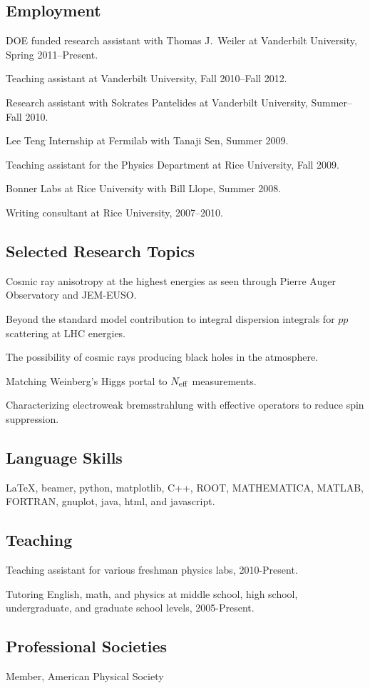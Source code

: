 \documentclass[letterpaper]{article}
\renewenvironment{itemize}{
\begin{list}{}{
\setlength{\leftmargin}{1.5em}
}
}{
\end{list}
}
\begin{document}
\subsection*{Employment}
\begin{itemize}
\item DOE funded research assistant with Thomas J.~Weiler at Vanderbilt University, Spring 2011--Present.
\item Teaching assistant at Vanderbilt University, Fall 2010--Fall 2012.
\item Research assistant with Sokrates Pantelides at Vanderbilt University, Summer--Fall 2010.
\item Lee Teng Internship at Fermilab with Tanaji Sen, Summer 2009.
\item Teaching assistant for the Physics Department at Rice University, Fall 2009.
\item Bonner Labs at Rice University with Bill Llope, Summer 2008.
\item Writing consultant at Rice University, 2007--2010.
\end{itemize}
\subsection*{Selected Research Topics}
\begin{itemize}
\item Cosmic ray anisotropy at the highest energies as seen through Pierre Auger Observatory and JEM-EUSO.
\item Beyond the standard model contribution to integral dispersion integrals for $pp$ scattering at LHC energies.
\item The possibility of cosmic rays producing black holes in the atmosphere.
\item Matching Weinberg's Higgs portal to $N_{\rm{eff}}$ measurements.
\item Characterizing electroweak bremsstrahlung with effective operators to reduce spin suppression.
\end{itemize}
\subsection*{Language Skills}
\begin{itemize}
\item 
\LaTeX, beamer, python, matplotlib, C++, ROOT, MATHEMATICA, MATLAB, FORTRAN, gnuplot, java, html, and javascript.
\end{itemize}
\subsection*{Teaching}
\begin{itemize}
\item Teaching assistant for various freshman physics labs, 2010-Present.
\item Tutoring English, math, and physics at middle school, high school, undergraduate, and graduate school levels, 2005-Present.
\end{itemize}
\subsection*{Professional Societies}
\begin{itemize}
\item Member, American Physical Society
\end{itemize}
\end{document}
